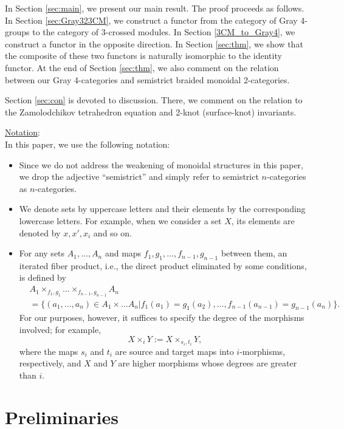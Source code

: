 \documentclass[11pt, reqno]{amsart} %
\theoremstyle{definition}
\theoremstyle{remark}
\numberwithin{equation}{section}
\begin{document}
In Section \ref{sec:main}, we present our main result. The proof proceeds as follows. In Section \ref{sec:Gray323CM}, we construct a functor from the category of Gray 4-groups to the category of 3-crossed modules. In Section \ref{3CM_to_Gray4}, we construct a functor in the opposite direction. In Section \ref{sec:thm}, we show that the composite of these two functors is naturally isomorphic to the identity functor. At the end of Section \ref{sec:thm}, we also comment on the relation between our Gray 4-categories and semistrict braided monoidal 2-categories.

Section \ref{sec:con} is devoted to discussion. There, we comment on the relation to the Zamolodchikov tetrahedron equation \cite{Zamolodchikov1980JETP} and 2-knot (surface-knot) invariants. 

\vspace{1em}
\noindent
\underline{Notation}: \\
In this paper, we use the following notation:
\begin{itemize}
  \item Since we do not address the weakening of monoidal structures in this paper, we drop the adjective ``semistrict'' and simply refer to semistrict $n$-categories as $n$-categories.
  \item We denote sets by uppercase letters and their elements by the corresponding lowercase letters. For example, when we consider a set $X$, its elements are denoted by $x,x',x_i$ and so on.
  \item For any sets $A_1,\ldots,A_n$ and maps $f_1,g_1,\ldots,f_{n-1},g_{n-1}$ between them, an iterated fiber product, i.e., the direct product eliminated by some conditions, is defined by
  \begin{align}
    \nonumber
    &A_1\times_{f_1,g_1}\ldots \times_{f_{n-1},g_{n-1}}A_n \\
    \nonumber
    &= \{(a_1,\ldots,a_n)\in A_1\times \ldots A_n|f_1(a_1)=g_1(a_2),\ldots,f_{n-1}(a_{n-1})=g_{n-1}(a_n)\}.
  \end{align}
  For our purposes, however, it suffices to specify the degree of the morphisms involved; for example,
  \[
    X\times_iY := X\times_{s_i,t_i}Y,
  \]
  where the maps $s_i$ and $t_i$ are source and target maps into $i$-morphisms, respectively, and $X$ and $Y$ are higher morphisms whose degrees are greater than $i$.
\end{itemize}




\section{Preliminaries}\label{sec:Pre}
\end{document}
